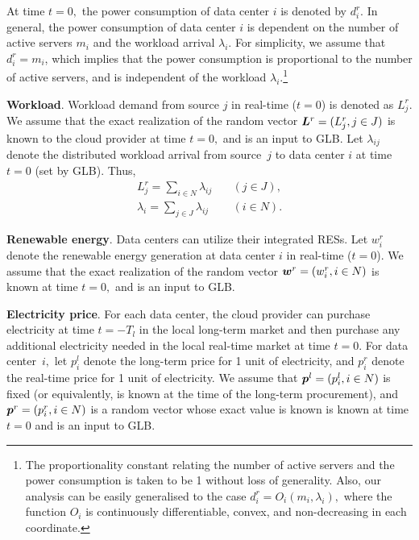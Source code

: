 At time $t = 0,$ the power consumption of data center $i$ is denoted
by $d^r_i.$ In general, the power consumption of data center $i$ is
dependent on the number of active servers $m_i$ and the workload
arrival
$\lambda_i$. %
For simplicity, we assume that $d^r_i = m_i$, which implies that the
power consumption is proportional to the number of active servers, and
is independent of the workload $\lambda_i$.\footnote{The
  proportionality constant relating the number of active servers and
  the power consumption is taken to be 1 without loss of
  generality. Also, our analysis can be easily generalised to the case
  $d^r_i = O_i(m_i, \lambda_i),$ where the function $O_i$ is
  continuously differentiable, convex, and non-decreasing in each
  coordinate.} %


\textbf{Workload}. Workload demand from source $j$ in real-time ($t = 0$) is denoted as $L^r_j.$ We assume that the exact realization of the random vector $\boldsymbol{L}^r = (L^r_j,j \in J)$ is known to the cloud provider at time $t = 0,$ and is an input to GLB. Let $\lambda_{ij}$ denote the distributed workload arrival from source~$j$ to data center $i$ at time $t = 0$ (set by GLB). Thus,
\begin{eqnarray*}
	\label{eq:constraintWorkload1}
	L^r_j = \sum_{i\in N}^{}\lambda_{ij}  & \quad (j\in J), \\
	\label{eq:constraintWorkload2}
	\lambda_i = \sum_{j\in J}^{}\lambda_{ij} & \quad (i \in N).
\end{eqnarray*}

\textbf{Renewable energy}. Data centers can utilize their integrated RESs. Let $w^r_i$ denote the renewable energy generation at data center $i$ in real-time ($t=0$). We assume that the exact realization of the random vector $\boldsymbol{w}^r = (w^r_i,i \in N)$ is known at time $t = 0,$ and is an input to GLB. 


\textbf{Electricity price}. For each data center, the cloud provider can purchase electricity at time $t=-T_l$ in the local long-term market and then purchase any additional electricity needed in the local real-time market at time $t = 0.$ For data center~$i,$ let $p^{l}_i$ denote the long-term price for 1 unit of electricity, and $p^{r}_i$ denote the real-time price for 1 unit of electricity. We assume that $\boldsymbol{p}^l = (p^l_i,i \in N)$ is fixed (or equivalently, is known at the time of the long-term procurement), and $\boldsymbol{p}^r= (p^r_i, i \in N)$ is a random vector whose exact value is known is known at time $t = 0$ and is an input to GLB.

